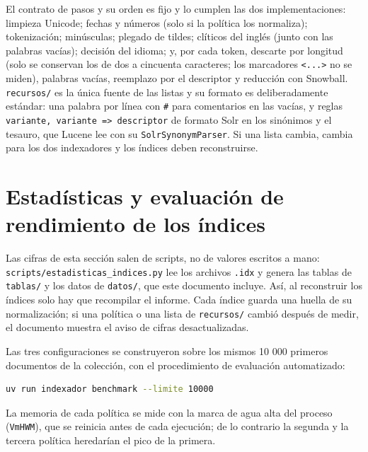 \documentclass[11pt,spanish]{article}
\begin{document}
El contrato de pasos y su orden es fijo y lo cumplen las dos implementaciones: limpieza Unicode; fechas y números (solo si la política los normaliza); tokenización; minúsculas; plegado de tildes; clíticos del inglés (junto con las palabras vacías); decisión del idioma; y, por cada token, descarte por longitud (solo se conservan los de dos a cincuenta caracteres; los marcadores \texttt{<...>} no se miden), palabras vacías, reemplazo por el descriptor y reducción con Snowball. \texttt{recursos/} es la única fuente de las listas y su formato es deliberadamente estándar: una palabra por línea con \texttt{\#} para comentarios en las vacías, y reglas \texttt{variante, variante => descriptor} de formato Solr en los sinónimos y el tesauro, que Lucene lee con su \texttt{SolrSynonymParser}. Si una lista cambia, cambia para los dos indexadores y los índices deben reconstruirse.

\section{Estadísticas y evaluación de rendimiento de los índices}
\label{sec:estadisticas}

Las cifras de esta sección salen de scripts, no de valores escritos a mano: \texttt{scripts/estadisticas\_indices.py} lee los archivos \texttt{.idx} y genera las tablas de \texttt{tablas/} y los datos de \texttt{datos/}, que este documento incluye. Así, al reconstruir los índices solo hay que recompilar el informe. Cada índice guarda una huella de su normalización; si una política o una lista de \texttt{recursos/} cambió después de medir, el documento muestra el aviso de cifras desactualizadas.


Las tres configuraciones se construyeron sobre los mismos 10 000 primeros documentos de la colección, con el procedimiento de evaluación automatizado:
\begin{lstlisting}[language=bash, caption={Ejecución comparativa de las tres políticas de indexación.}]
uv run indexador benchmark --limite 10000
\end{lstlisting}
La memoria de cada política se mide con la marca de agua alta del proceso (\texttt{VmHWM}), que se reinicia antes de cada ejecución; de lo contrario la segunda y la tercera política heredarían el pico de la primera.
\end{document}
